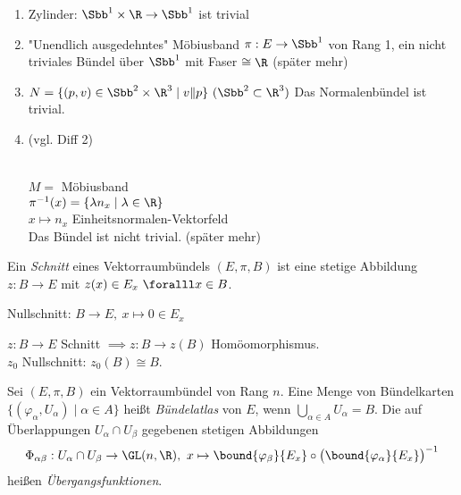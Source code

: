 \begin{exmp*}
	\begin{enumerate}[label = {\roman*})]
		\item 	Zylinder: $ \Sbb^1 \times \R \to \Sbb^1 $ ist trivial
		\item "Unendlich ausgedehntes" Möbiusband  $ \pi: E \to \Sbb^1 $ von Rang 1, ein nicht triviales Bündel über $\Sbb^1$ mit Faser $\cong \R$ (später mehr)
		\item $ N = \{(p,v) \in \Sbb^2 \times \R^3 \mid v \| p\}\ (\Sbb^2 \subset \R^3) $
			Das Normalenbündel ist trivial.
		\item \begin{minipage}{\linewidth}
				\begin{wrapfigure}{R}{5cm}
					\centering
				\end{wrapfigure}
				(vgl. Diff 2)
			\end{minipage} \\
			$ M = $ Möbiusband\\
			$ \pi^{-1}(x) = \{\lambda n_x \mid \lambda \in \R\} $\\
			$ x \mapsto n_x$ Einheitsnormalen-Vektorfeld\\
			Das Bündel ist nicht trivial. (später mehr)
	\end{enumerate}
\end{exmp*}

\begin{defn}[Schnitt]
	Ein \emph{Schnitt} eines Vektorraumbündels $ (E,\pi,B) $ ist eine stetige Abbildung $ z: B \to E $ mit $z(x) \in E_x\ \foralll x \in B$.
\end{defn}
	
\begin{exmp*}
	Nullschnitt: $ B \to E,\ x \mapsto 0 \in E_x $
\end{exmp*}

\begin{rem*}
	$ z: B \to E $ Schnitt $ \implies z: B \to z(B) $ Homöomorphismus.\\
	$z_0$ Nullschnitt: $z_0(B) \cong B$.
\end{rem*}

\begin{defn} 
	Sei $ (E,\pi,B) $ ein Vektorraumbündel von Rang $n$. Eine Menge von Bündelkarten $ \{(\varphi_\alpha, U_\alpha) \mid \alpha \in A\} $ heißt \emph{Bündelatlas} von $E$, wenn $ \bigcup_{\alpha \in A} U_\alpha = B. $
	Die auf Überlappungen $ U_\alpha \cap U_\beta $ gegebenen stetigen Abbildungen 
	$$ \Phi_{\alpha \beta}: U_\alpha \cap U_\beta \to \GL(n,\R),\ x \mapsto \bound{\varphi_\beta}{E_x} \circ \big( \bound{ \varphi_\alpha}{E_x} \big)^{-1} $$
	heißen \emph{Übergangsfunktionen}.
\end{defn}

